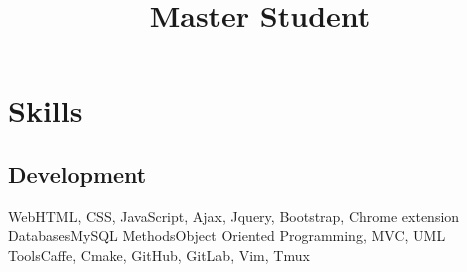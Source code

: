 \documentclass[11pt,a4paper,nolmodern]{moderncv}
\title{Master Student}
\begin{document}
\setmainfont{Minion Pro}
\setsansfont{Myriad Pro}

\maketitle

\section{Skills}


\subsection{Development}
           {Web}{HTML, CSS, JavaScript, Ajax, Jquery, Bootstrap, Chrome extension}
           {Databases}{MySQL}
           {Methods}{Object Oriented Programming, MVC, UML}
           {Tools}{Caffe, Cmake, GitHub, GitLab, Vim, Tmux}

\end{document}
